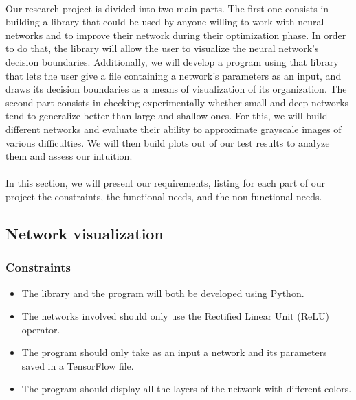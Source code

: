 \documentclass[a4paper]{article}
\begin{document}
\paragraph{}Our research project is divided into two main parts. The first one consists in building a library that could be used by anyone willing to work with neural networks and to improve their network during their optimization phase. In order to do that, the library will allow the user to visualize the neural network's decision boundaries. Additionally, we will develop a program using that library that lets the user give a file containing a network's parameters as an input, and draws its decision boundaries as a means of visualization of its organization. The second part consists in checking experimentally whether small and deep networks tend to generalize better than large and shallow ones. For this, we will build different networks and evaluate their ability to approximate grayscale images of various difficulties. We will then build plots out of our test results to analyze them and assess our intuition.

\paragraph{}In this section, we will present our requirements, listing for each part of our project the constraints, the functional needs, and the non-functional needs. 

\subsection{Network visualization}
\subsubsection{Constraints}
\begin{itemize}
\item The library and the program will both be developed using Python.
\item The networks involved should only use the Rectified Linear Unit (ReLU) operator. 
\item The program should only take as an input a network and its parameters saved in a TensorFlow file.
\item The program should display all the layers of the network with different colors.
\end{itemize}
\end{document}
